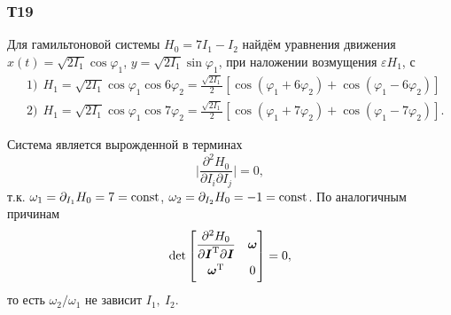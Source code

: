 \subsubsection*{Т19}



Для гамильтоновой системы $H_0 = 7 I_1 - I_2$ найдём уравнения движения $x(t) = \sqrt{2 I_1} \cos \varphi_1$, $y = \sqrt{2 I_1} \sin \varphi_1$, при наложении возмущения $\varepsilon H_1$, с 
\begin{align*}
    &1) \ \ H_1 = \sqrt{2 I_1} \cos \varphi_1 \cos 6 \varphi_2 = \frac{\sqrt{2 I_1}}{2} \left[
        \cos(\varphi_1 + 6 \varphi_2) + \cos(\varphi_1-6\varphi_2)
    \right] \\
    &2) \ \ H_1 = \sqrt{2 I_1} \cos \varphi_1 \cos 7 \varphi_2 = \frac{\sqrt{2 I_1}}{2} \left[
        \cos(\varphi_1 + 7 \varphi_2) + \cos(\varphi_1-7\varphi_2)
    \right].
\end{align*}

Система является вырожденной в терминах
\begin{equation*}
        \bigg|
            \frac{\partial^2 H_0}{\partial I_i \partial I_j} 
        \bigg| = 0,
\end{equation*}
т.к. $\omega_1 = \partial_{I_1} H_0 = 7 = \text{const}$, $\omega_2 = \partial_{I_2} H_0 = -1 = \text{const}$.
По аналогичным причинам
\begin{equation*}
            \det \begin{bmatrix}
        \vphantom{\dfrac{1}{2}}
            \dfrac{\partial^2 H_0}{\partial \vc{I}\T \partial \vc{I}} & \vc{\omega} \\
        \vphantom{\dfrac{1}{2}}
            \vc{\omega}\T & 0
        \end{bmatrix} = 0,
\end{equation*}
то есть $\omega_2/\omega_1$ не зависит $I_1, \ I_2$.

